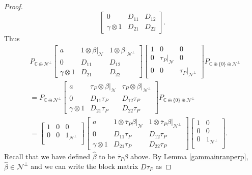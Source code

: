 \documentclass[11pt, reqno]{amsart}
\newcommand\1{\boldsymbol {1}}
\numberwithin{equation}{section}
\begin{document}
\begin{proof}
$$\begin{bmatrix}
    0 & D_{11} & D_{12}\\
    \gamma\otimes 1 & D_{21} & D_{22}
\end{bmatrix}.$$
Thus
\begin{align*}
&P_{\mathbb{C}\oplus\mathcal{N}^{\perp}}\begin{bmatrix}
    a & 1\otimes \beta|_{\mathcal{N}} & 1\otimes \beta|_{\mathcal{N}^{\perp}}\\
    0 & D_{11} & D_{12}\\
    \gamma\otimes 1 & D_{21} & D_{22}
\end{bmatrix}\begin{bmatrix}
    1 & 0 & 0 \\
    0& \tau_{P}|_{\mathcal{N}} & 0 \\
    0 & 0 & \tau_{P}|_{\mathcal{N}^{\perp}}
\end{bmatrix}P_{\mathbb{C}\oplus\{0\}\oplus\mathcal{N}^{\perp}}\\
&=P_{\mathbb{C}\oplus\mathcal{N}^{\perp}}\begin{bmatrix}
    a & \tau_{P}\otimes \beta|_{\mathcal{N}} & \tau_{P}\otimes \beta|_{\mathcal{N}^{\perp}}\\
    0 & D_{11}\tau_{P} & D_{12}\tau_{P}\\
    \gamma\otimes 1 & D_{21}\tau_{P} & D_{22}\tau_{P}
\end{bmatrix}P_{\mathbb{C}\oplus\{0\}\oplus\mathcal{N}^{\perp}}\\
&=\begin{bmatrix}
    1       & 0 & 0\\
   0       & 0 & 1_{\mathcal{N}^{\perp}}\\
\end{bmatrix}\begin{bmatrix}
    a & 1\otimes \overline{\tau}_{P}\beta|_{\mathcal{N}} & 1\otimes \overline{\tau}_{P}\beta|_{\mathcal{N}^{\perp}}\\
    0 & D_{11}\tau_{P} & D_{12}\tau_{P}\\
    \gamma\otimes 1 & D_{21}\tau_{P} & D_{22}\tau_{P}
\end{bmatrix}\begin{bmatrix}
    1       & 0 \\
   0       & 0 \\
   0 & 1_{\mathcal{N}^{\perp}}\\
\end{bmatrix}.
\end{align*}
Recall that we have defined  ${\hat{\beta}}$ to be   $ \overline{\tau}_{P}\beta$ above.
By Lemma \ref{gammainranperp}, $\hat{\beta} \in\mathcal{N}^{\perp}$ and we can write the block matrix $D\tau_{P}$ as 

\end{proof}
\end{document}
